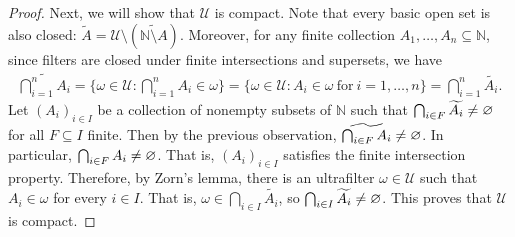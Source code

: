 \documentclass[a4paper,10pt]{report}
\newcommand{\N}{\mathbb{N}}
\begin{document}
\begin{enumerate}
\begin{enumerate}
\begin{proof}
					Next, we will show that $\mathscr{U}$ is compact.
					Note that every basic open set is also closed:
					$\widetilde{A} = \mathscr{U} \setminus \left( \widetilde{\N \setminus A} \right)$.
					Moreover, for any finite collection $A_1, \dots, A_n \subseteq \N$,
					since filters are closed under finite intersections and supersets, we have
					\begin{align*}
						\widetilde{\bigcap_{i=1}^n{A_i}}
						 = \{\omega \in \mathscr{U} : \bigcap_{i=1}^n{A_i} \in \omega\}
						 = \{\omega \in \mathscr{U} : A_i \in \omega~\text{for}~i = 1, \dots, n\}
						 = \bigcap_{i=1}^n{\widetilde{A_i}}.
					\end{align*}
					Let $(A_i)_{i \in I}$ be a collection of nonempty subsets of $\N$
					such that $\bigcap_{i \in F}{\widetilde{A_i}} \ne \varnothing$ for all $F \subseteq I$ finite.
					Then by the previous observation, $\widetilde{\bigcap_{i \in F}{A_i}} \ne \varnothing$.
					In particular, $\bigcap_{i \in F}{A_i} \ne \varnothing$.
					That is, $(A_i)_{i \in I}$ satisfies the finite intersection property.
					Therefore, by Zorn's lemma, there is an ultrafilter $\omega \in \mathscr{U}$
					such that $A_i \in \omega$ for every $i \in I$.
					That is, $\omega \in \bigcap_{i \in I}{\widetilde{A_i}}$,
					so $\bigcap_{i \in I}{\widetilde{A_i}} \ne \varnothing$.
					This proves that $\mathscr{U}$ is compact.
					

\end{proof}
\end{enumerate}
\end{enumerate}
\end{document}
